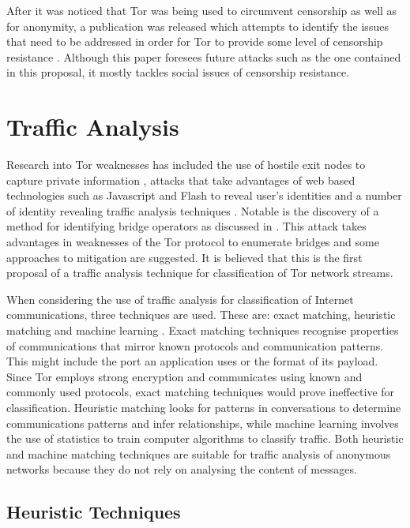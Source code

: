 \documentclass{ecuthesis}
\begin{document}
After it was noticed that Tor was being used to circumvent censorship as well
as for anonymity, a publication was released which attempts to identify the
issues that need to be addressed in order for Tor to provide some level of
censorship resistance \parencite{Dingledine:2008p1542}. Although this paper
foresees future attacks such as the one contained in this proposal, it mostly
tackles social issues of censorship resistance.

\section{Traffic Analysis}

Research into Tor weaknesses has included the use of hostile exit nodes to
capture private information \parencite{website:tor-password-leak}, attacks that
take advantages of web based technologies such as Javascript and Flash to
reveal user's identities \parencite{Abbott:2007p298} and a number of identity
revealing traffic analysis techniques
\parencite{Murdoch:2005p325,Abbott:2007p298,Evans:2009p315}. Notable is the
discovery of a method for identifying bridge operators as discussed in
\textcite{McLachlan:2009p197}. This attack takes advantages in weaknesses of
the Tor protocol to enumerate bridges and some approaches to mitigation are
suggested. It is believed that this is the first proposal of a traffic analysis
technique for classification of Tor network streams.

When considering the use of traffic analysis for classification of Internet
communications, three techniques are used. These are: exact matching, heuristic
matching and machine learning \parencite{Zhang:2009p1188}. Exact matching
techniques recognise properties of communications that mirror known protocols
and communication patterns. This might include the port an application uses or
the format of its payload. Since Tor employs strong encryption and communicates
using known and commonly used protocols, exact matching techniques would prove
ineffective for classification. Heuristic matching looks for patterns in
conversations to determine communications patterns and infer relationships,
while machine learning involves the use of statistics to train computer
algorithms to classify traffic. Both heuristic and machine matching techniques
are suitable for traffic analysis of anonymous networks because they do not
rely on analysing the content of messages.

\subsection{Heuristic Techniques}
\end{document}
